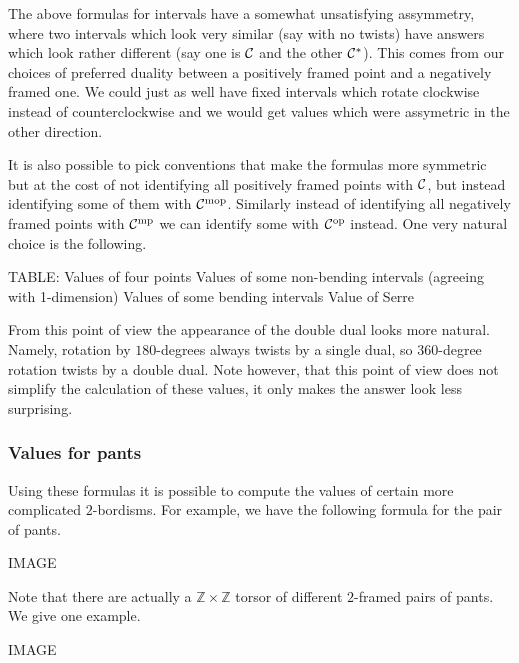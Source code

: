\documentclass{amsart}
\begin{document}
\begin{remark}
The above formulas for intervals have a somewhat unsatisfying assymmetry, where two intervals which look very similar (say with no twists) have answers which look rather different (say one is $\mathcal C$ and the other $\mathcal C^*$).  This comes from our choices of preferred duality between a positively framed point and a negatively framed one.  We could just as well have fixed intervals which rotate clockwise instead of counterclockwise and we would get values which were assymetric in the other direction.  

It is also possible to pick conventions that make the formulas more symmetric but at the cost of not identifying all positively framed points with $\mathcal C$, but instead identifying some of them with $\mathcal C^{\mathrm{mop}}$.  Similarly instead of identifying all negatively framed points with $\mathcal C^{\mathrm{mp}}$ we can identify some with $\mathcal C^{\mathrm{op}}$ instead.  One very natural choice is the following.

TABLE:
Values of four points
Values of some non-bending intervals (agreeing with 1-dimension)
Values of some bending intervals
Value of Serre

From this point of view the appearance of the double dual looks more natural.  Namely, rotation by $180$-degrees always twists by a single dual, so $360$-degree rotation twists by a double dual.  Note however, that this point of view does not simplify the calculation of these values, it only makes the answer look less surprising.
\end{remark}

\subsubsection{Values for pants}

Using these formulas it is possible to compute the values of certain more complicated $2$-bordisms.  For example, we have the following formula for the pair of pants.

IMAGE

Note that there are actually a $\mathbb{Z}\times \mathbb{Z}$ torsor of different $2$-framed pairs of pants.  We give one example.

IMAGE


\end{document}
